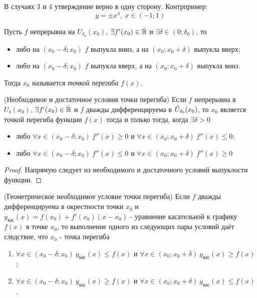 \begin{note}
	В случаях 3 и 4 утверждение верно в одну сторону. Контрпример: 
	\[
		y = \pm x^4,\ x \in (-1; 1)
	\]
\end{note}

\begin{definition}
	Пусть $f$ непрерывна на $U_{\delta_0}(x_0)$, $\exists f'(x_0) \in \bar{\mathbb{R}}$ и $\exists \delta \in (0; \delta_0)$, то
	\begin{itemize}
		\item либо на $(x_0 - \delta; x_0)$ $f$ выпукла вниз, а на $(x_0; x_0 + \delta)$ выпукла вверх;
		
		\item либо на $(x_0 - \delta; x_0)$ $f$ выпукла вверх, а на $(x_0; x_0 + \delta)$ выпукла вниз.
	\end{itemize}
	Тогда $x_0$ называется \textit{точкой перегиба} $f(x)$.
\end{definition}

\begin{theorem} (Необходимое и достаточное условия точки перегиба)
	Если $f$ непрерывна в $U_\delta(x_0)$, $\exists f'(x_0) \in \bar{\mathbb{R}}$ и $f$ дважды дифференцируема в $\mathring{U}_{\delta_0}(x_0)$, то $x_0$ является точкой перегиба функции $f(x)$ тогда и только тогда, когда $\exists \delta > 0$
	\begin{itemize}
		\item либо $\forall x \in (x_0 - \delta; x_0)\ f''(x) \ge 0$ и $\forall x \in (x_0; x_0 + \delta)\ f''(x) \le 0$;
		
		\item либо $\forall x \in (x_0 - \delta; x_0)\ f''(x) \le 0$ и $\forall x \in (x_0; x_0 + \delta)\ f''(x) \ge 0$
	\end{itemize}
\end{theorem}

\begin{proof}
	Напрямую следует из необходимого и достаточного условий выпуклости функции.
\end{proof}

\begin{theorem} (Геометрическое необходимое условие точки перегиба)
	Если $f$ дважды дифференцируема в окрестности точки $x_0$ и $y_{\text{кас}}(x) = f(x_0) + f'(x_0) (x - x_0)$ - уравнение касательной к графику $f(x)$ в точке $x_0$, то выполнение одного из следующих пары условий даёт следствие, что $x_0$ - точка перегиба
	\begin{enumerate}
		\item $\forall x \in (x_0 - \delta; x_0)\ y_{\text{кас}}(x) \le f(x)$ и $\forall x \in (x_0; x_0 + \delta)\ y_{\text{кас}}(x) \ge f(x)$;
		
		\item $\forall x \in (x_0 - \delta; x_0)\ y_{\text{кас}}(x) \ge f(x)$ и $\forall x \in (x_0; x_0 + \delta)\ y_{\text{кас}}(x) \le f(x)$.
	\end{enumerate}
\end{theorem}

